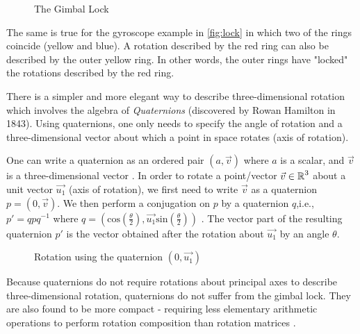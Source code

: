 \begin{figure}[H]
\centering
{}%
\qquad
{}
\caption{The Gimbal Lock}
\label{gimbal}
\end{figure}

The same is true for the gyroscope example in \ref{fig:lock} in which two of the rings coincide (yellow and blue). A rotation described by the red ring can also be described by the outer yellow ring. In other words, the outer rings have "locked" the rotations described by the red ring.

There is a simpler and more elegant way to describe three-dimensional rotation which involves the algebra of \emph{Quaternions} (discovered by Rowan Hamilton in 1843). Using quaternions, one only needs to specify the angle of rotation and a three-dimensional vector about which a point in space rotates (axis of rotation). 

One can write a quaternion as an ordered pair $(a,\vec{v})$ where $a$ is a scalar, and $\vec{v}$ is a three-dimensional vector \cite{mathoma}. In order to rotate a point/vector $\vec{v} \in \operatorname{\mathbb{R}}^3$ about a unit vector $\vec{u_1}$ (axis of rotation), we first need to write $\vec{v}$ as a quaternion $p = (0,\vec{v})$. We then perform a conjugation on $p$ by a quaternion $q$,i.e., $p' = qpq^{-1}$ where $q = (\text{cos}(\frac{\theta}{2}),\vec{u_1} \text{sin}(\frac{\theta}{2}))$ \cite{balmens2}. The vector part of the resulting quaternion $p'$ is the vector obtained after the rotation about $\vec{u_1}$ by an angle $\theta$. 

\begin{figure}[t]
	\centering
	\qquad
	\caption{\cite{balmens2} Rotation using the quaternion $(0,\vec{u_1})$}
	\label{quatrot}
\end{figure}

Because quaternions do not require rotations about principal axes to describe three-dimensional rotation, quaternions do not suffer from the gimbal lock. They are also found to be more compact - requiring less elementary arithmetic operations to perform rotation composition than rotation matrices \cite{lerios}. 

